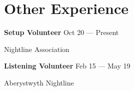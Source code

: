 \section{Other Experience}





\parbox[t][][t]{\linewidth}{
	\parbox{\linewidth}{\textbf{Setup Volunteer} \hfill {{Oct 20 --- Present}}}
	\parbox{\linewidth}{Nightline Association}
	\smallskip
}



\parbox[t][][t]{\linewidth}{
	\parbox{\linewidth}{\textbf{Listening Volunteer} \hfill {{Feb 15 --- May 19}}}
	\parbox{\linewidth}{Aberystwyth Nightline}
	\smallbreak
	\smallskip
}


